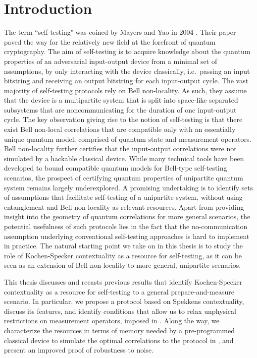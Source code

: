\chapter{Introduction}
The term ``self-testing" was coined by Mayers and Yao in 2004 \cite{Mayers2003}. Their paper paved the way for the relatively new field at the forefront of quantum cryptography. The aim of self-testing is to acquire knowledge about the quantum properties of an adversarial input-output device from a minimal set of assumptions, by only interacting with the device classically, i.e.\ passing an input bitstring and receiving an output bitstring for each input-output cycle. The vast majority of self-testing protocols rely on Bell non-locality. As such, they assume that the device is a multipartite system that is split into space-like separated subsystems that are noncommunicating for the duration of one input-output cycle. The key observation giving rise to the notion of self-testing is that there exist Bell non-local correlations that are compatible only with an essentially unique quantum model, comprised of quantum state and measurement operators. Bell non-locality further certifies that the input-output correlations were not simulated by a hackable classical device. While
many technical tools have been developed to bound compatible quantum models for Bell-type self-testing scenarios, the prospect of certifying quantum properties of unipartite quantum system remains largely underexplored. A promising undertaking is to identify sets of assumptions that facilitate self-testing of a unipartite system, without using entanglement and Bell non-locality as relevant resources. Apart from providing insight into the geometry of quantum correlations for more general scenarios, the potential usefulness of such protocols lies in the fact that the no-communication assumption underlying conventional self-testing approaches is hard to implement in practice. The natural starting point we take on in this thesis is to study the role of Kochen-Specker contextuality as a resource for self-testing, as it can be seen as an extension of Bell non-locality to more general, unipartite scenarios. 

This thesis discusses and recasts previous results \cite{Bharti2019} that identify Kochen-Specker contextuality as a resource for self-testing to a general prepare-and-measure scenario. In particular, we propose a protocol based on Spekkens contextuality, discuss its features, and identify conditions that allow us to relax unphysical restrictions on measurement operators, imposed in \cite{Bharti2019}. Along the way, we characterize the resources in terms of memory needed by a pre-programmed classical device to simulate the optimal correlations to the protocol in \cite{Bharti2019}, and present an improved proof of robustness to noise.

